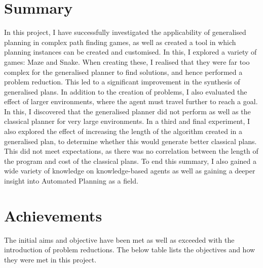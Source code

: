 \section{Summary}
In this project, I have successfully investigated the applicability of generalised planning in complex path finding games, as well as created a tool in which planning instances can be created and customised. In this, I explored a variety of games: Maze and Snake. When creating these, I realised that they were far too complex for the generalised planner to find solutions, and hence performed a problem reduction. This led to a significant improvement in the synthesis of generalised plans. In addition to the creation of problems, I also evaluated the effect of larger environments, where the agent must travel further to reach a goal. In this, I discovered that the generalised planner did not perform as well as the classical planner for very large environments. In a third and final experiment, I also explored the effect of increasing the length of the algorithm created in a generalised plan, to determine whether this would generate better classical plans. This did not meet expectations, as there was no correlation between the length of the program and cost of the classical plans. To end this summary, I also gained a wide variety of knowledge on knowledge-based agents as well as gaining a deeper insight into Automated Planning as a field.

\newpage
\section{Achievements}
The initial aims and objective have been met as well as exceeded with the introduction of problem reductions. The below table lists the objectives and how they were met in this project.

